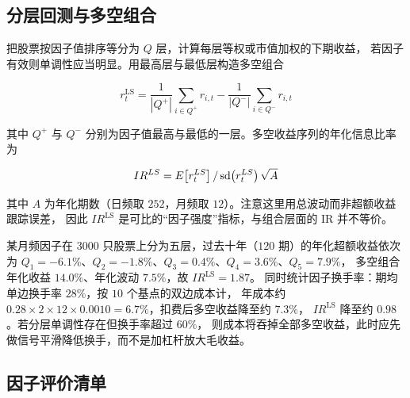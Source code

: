 \subsection{分层回测与多空组合}

把股票按因子值排序等分为 $Q$ 层，计算每层等权或市值加权的下期收益，
若因子有效则单调性应当明显。用最高层与最低层构造多空组合

\begin{equation}
  r_t^{\text{LS}} = \frac{1}{|Q^{+}|}\sum_{i \in Q^{+}} r_{i,t} - \frac{1}{|Q^{-}|}\sum_{i \in Q^{-}} r_{i,t}
  \label{eq:07-longshort}
\end{equation}

其中 $Q^{+}$ 与 $Q^{-}$ 分别为因子值最高与最低的一层。多空收益序列的年化信息比率为

\begin{equation}
  IR^{LS} = E\!\left[r_t^{LS}\right]/\operatorname{sd}\!\left(r_t^{LS}\right)\sqrt{A}
  \label{eq:07-irls}
\end{equation}

其中 $A$ 为年化期数（日频取 $252$，月频取 $12$）。注意这里用总波动而非超额收益跟踪误差，
因此 $IR^{\text{LS}}$ 是可比的“因子强度”指标，与组合层面的 IR 并不等价。

\begin{example}[单调性与换手率的联合判读]\label{ex:07-monotone}
某月频因子在 $3000$ 只股票上分为五层，过去十年（$120$ 期）的年化超额收益依次为
$Q_1 = -6.1\%$、$Q_2 = -1.8\%$、$Q_3 = 0.4\%$、$Q_4 = 3.6\%$、$Q_5 = 7.9\%$，
多空组合年化收益 $14.0\%$、年化波动 $7.5\%$，故 $IR^{\text{LS}} = 1.87$。
同时统计因子换手率：期均单边换手率 $28\%$，按 $10$ 个基点的双边成本计，
年成本约 $0.28 \times 2 \times 12 \times 0.0010 = 6.7\%$，扣费后多空收益降至约 $7.3\%$，
$IR^{\text{LS}}$ 降至约 $0.98$。若分层单调性存在但换手率超过 $60\%$，
则成本将吞掉全部多空收益，此时应先做信号平滑降低换手，而不是加杠杆放大毛收益。
\end{example}

\subsection{因子评价清单}

